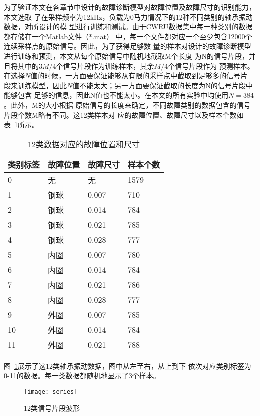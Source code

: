 为了验证本文在各章节中设计的故障诊断模型对故障位置及故障尺寸的识别能力，本文选取
了在采样频率为12kHz，负载为0马力情况下的12种不同类别的轴承振动数据，对所设计的模
型进行训练和测试。由于CWRU数据集中每一种类别的数据都存储在一个Matlab文件（*.mat）
中，每一个文件都对应一个至少包含12000个连续采样点的原始信号。因此，为了获得足够数
量的样本对设计的故障诊断模型进行训练和预测，本文从每个原始信号中随机地截取M个长度
为N的信号片段，并且将其中的$3M/4$个信号片段作为训练样本，其余$M/4$个信号片段作为
预测样本。在选择$N$值的时候，一方面要保证能够从有限的采样点中截取到足够多的信号片
段来训练模型，因此$N$值不能太大；另一方面要保证截取的长度为N的信号片段中能够包含
足够的信息，因此N值也不能太小。在本文的所有实验中均使用$N=384$。此外，M的大小根据
原始信号的长度来确定，不同故障类别的数据包含的信号片段个数M略有不同。这12类样本对
应的故障位置、故障尺寸以及样本个数如表~\ref{tab:class_desc}所示。
\begin{table}[htb]
  \centering
  \begin{minipage}[t]{0.7\linewidth} %
  \caption{12类数据对应的故障位置和尺寸}
  \label{tab:class_desc}
    \begin{tabularx}{\linewidth}{XXXX}
      \toprule[1.5pt]
      类别标签 & 故障位置 & 故障尺寸 & 样本个数 \\
      \midrule[1pt]
      0  & 无   & 无    & 1579 \\
      \midrule[1pt]
      1  & 钢球 & 0.007 &  710 \\
      2  & 钢球 & 0.014 &  784 \\
      3  & 钢球 & 0.021 &  785 \\
      4  & 钢球 & 0.028 &  777 \\
      \midrule[1pt]
      5  & 内圈 & 0.007 &  780 \\
      6  & 内圈 & 0.014 &  784 \\
      7  & 内圈 & 0.021 &  786 \\
      8  & 内圈 & 0.028 &  777 \\
      \midrule[1pt]
      9  & 外圈 & 0.007 &  785 \\
      10 & 外圈 & 0.014 &  784 \\
      11 & 外圈 & 0.021 &  788 \\
      \bottomrule[1.5pt]
    \end{tabularx}
  \end{minipage}
\end{table}

图~\ref{fig:series}展示了这12类轴承振动数据，图中从左至右，从上到下
依次对应类别标签为0-11的数据。每一类数据都随机地显示了3个样本。
\begin{figure}[ht]
  \centering
  \texttt{[image: series]}
  \caption{12类信号片段波形}
  \label{fig:series}
\end{figure}


